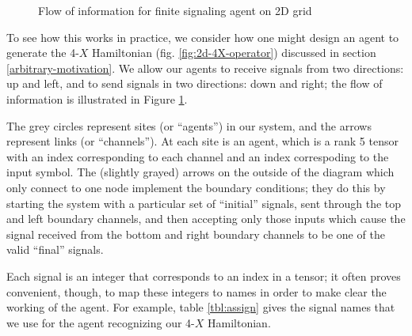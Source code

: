 \documentclass[12pt]{amsbook}
\theoremstyle{plain}
\theoremstyle{definition}
\theoremstyle{remark}
\begin{document}
\begin{figure}
\caption{Flow of information for finite signaling agent on 2D grid}
\label{fig:2d-information-flow}
\end{figure}

To see how this works in practice, we consider how one might design an agent to generate the 4-$X$ Hamiltonian (fig. \ref{fig:2d-4X-operator}) discussed in section \ref{arbitrary-motivation}.  We allow our agents to receive signals from two directions: up and left, and to send signals in two directions:  down and right;  the flow of information is illustrated in Figure \ref{fig:2d-information-flow}.

The grey circles represent sites (or ``agents'') in our system, and the arrows represent links (or ``channels'').  At each site is an agent, which is a rank 5 tensor with an index corresponding to each channel and an index correspoding to the input symbol.  The (slightly grayed) arrows on the outside of the diagram which only connect to one node implement the boundary conditions;  they do this by starting the system with a particular set of ``initial'' signals, sent through the top and left boundary channels, and then accepting only those inputs which cause the signal received from the bottom and right boundary channels to be one of the valid ``final'' signals.

Each signal is an integer that corresponds to an index in a tensor;  it often proves convenient, though, to map these integers to names in order to make clear the working of the agent.  For example, table \ref{tbl:assign} gives the signal names that we use for the agent recognizing our 4-$X$ Hamiltonian.
\end{document}
